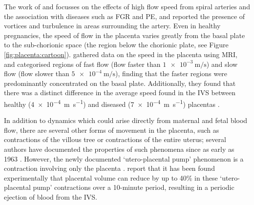         The work of \citeauthor{burtonRheologicalPhysiologicalConsequences2009} \cite{burtonRheologicalPhysiologicalConsequences2009} and \citeauthor{rothDynamicModelingUteroplacental2017} \cite{rothDynamicModelingUteroplacental2017} focusses on the effects of high flow speed from spiral arteries and the association with diseases such as FGR and PE, and reported the presence of vortices and turbulence in areas surrounding the artery. Even in healthy pregnancies, the speed of flow in the placenta varies greatly from the basal plate to the sub-chorionic space (the region below the chorionic plate, see Figure \ref{fig:placenta:cartoon}). \citeauthor{dellschaftHaemodynamicsHumanPlacenta2020} \cite{dellschaftHaemodynamicsHumanPlacenta2020} gathered data on the speed in the placenta using MRI, and categorised regions of fast flow (flow faster than $\qty{1e-3}{\metre\per\second}$) and slow flow (flow slower than $\qty{5e-4}{\metre\per\second}$), finding that the faster regions were predominantly concentrated on the basal plate. Additionally, they found that there was a distinct difference in the average speed found in the IVS between healthy (\qty{4e-4}{\metre\per\second}) and diseased (\qty{7e-4}{\metre\per\second}) placentas \cite{dellschaftHaemodynamicsHumanPlacenta2020}. 

        In addition to dynamics which could arise directly from maternal and fetal blood flow, there are several other forms of movement in the placenta, such as contractions of the villous tree or contractions of the entire uterus; several authors have documented the properties of such phenomena since as early as 1963 \cite{krantzContractilePropertiesSmooth1963,farleyContractilePropertiesHuman2004,lecarpentierUltraslowMyosinMolecular2014,togashiSustainedUterineContractions1993}. However, the newly documented `utero-placental pump' phenomenon is a contraction involving only the placenta \cite{dellschaftHaemodynamicsHumanPlacenta2020}. \citeauthor{dellschaftHaemodynamicsHumanPlacenta2020} \cite{dellschaftHaemodynamicsHumanPlacenta2020} report that it has been found experimentally that placental volume can reduce by up to 40\% in these `utero-placental pump' contractions over a 10-minute period, resulting in a periodic ejection of blood from the IVS. 

